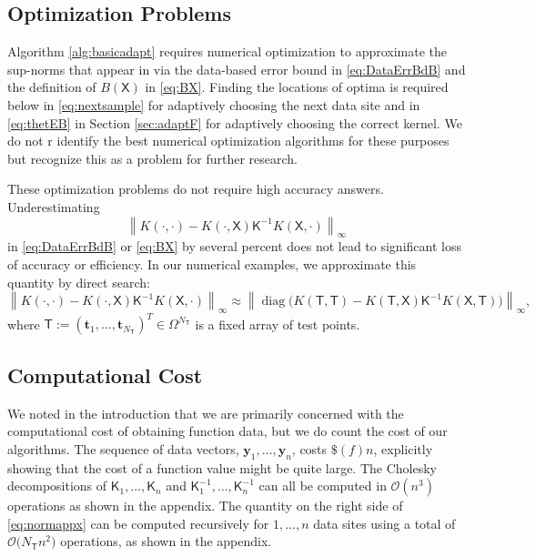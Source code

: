 \documentclass[]{mcom-l}
\theoremstyle{remark}
\DeclareMathOperator{\diag}{diag}
\newcommand{\NT}{{N_{\mT}}}
\newcommand{\mK}{\mathsf{K}}
\newcommand{\mT}{\mathsf{T}}
\newcommand{\mX}{\mathsf{X}}
\newcommand{\by}{{\boldsymbol{y}}}
\newcommand{\bt}{{\boldsymbol{t}}}
\newcommand{\cx}{{\Omega}}
\newcommand{\norm}[2][{}]{\ensuremath{\left \lVert #2 \right \rVert}_{#1}}
\newcommand{\Order}{\mathcal{O}}
\begin{document}
\subsection{Optimization Problems} \label{sec:Optim}

Algorithm \ref{alg:basicadapt} requires numerical optimization to  
approximate the sup-norms that appear in via the data-based error bound in \eqref{eq:DataErrBdB} and the definition of $B(\mX)$ in \eqref{eq:BX}.  Finding the locations of optima is required below in \eqref{eq:nextsample} for adaptively choosing the next data site and in \eqref{eq:thetEB} in Section \ref{sec:adaptF} for adaptively choosing the correct kernel.  We do not r identify the best numerical optimization algorithms for these purposes but recognize this as a problem for further research.  

These optimization problems do not require high accuracy answers.  Underestimating 
\[\norm[\infty]{K(\cdot,\cdot) - K(\cdot,\mX) \mK^{-1} K(\mX,\cdot)}\]
in  \eqref{eq:DataErrBdB} or  \eqref{eq:BX} by several percent does not lead to significant loss of accuracy or efficiency.  
In our numerical examples, we approximate this quantity by direct search:
\begin{equation} \label{eq:normappx}
\norm[\infty]{K(\cdot,\cdot) - K(\cdot,\mX) \mK^{-1} K(\mX,\cdot)} \approx \norm[\infty]{\diag\bigl(K(\mT,\mT) - K(\mT,\mX) \mK^{-1} K(\mX,\mT) \bigr)},
\end{equation}
where $\mT := (\bt_1, \ldots, \bt_\NT)^T \in \cx^\NT$ is a fixed array of test points.



\subsection{Computational Cost} \label{sec:compCost}
We noted in the introduction that we are primarily concerned with the computational cost of obtaining function data, but we do count the cost of our algorithms.  The sequence of data vectors, $\by_1, \ldots, \by_n$, costs $\$(f)n$, explicitly showing that the cost of a function value might be quite large.  The Cholesky decompositions of $\mK_1, \ldots, \mK_n$ and $\mK_1^{-1}, \ldots, \mK_n^{-1}$ can all be computed in $\Order(n^3)$ operations as shown in the appendix.  The quantity on the right side of \eqref{eq:normappx} can be computed recursively for $1, \ldots, n$ data sites using a total of $\Order\bigl( \NT n^2 \bigr)$ operations, as shown in the appendix.  
\end{document}

